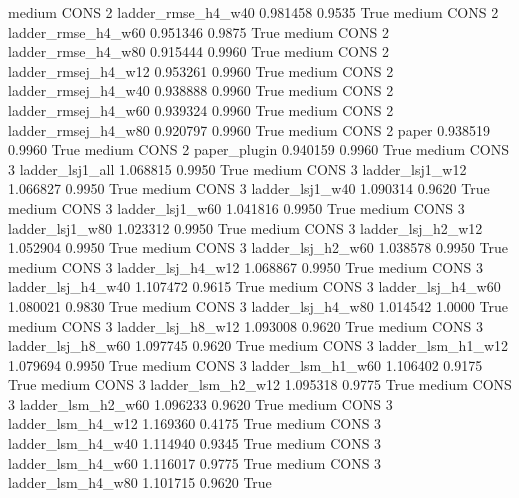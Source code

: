     medium     CONS                 2  ladder_rmse_h4_w40   0.981458      0.9535    True
    medium     CONS                 2  ladder_rmse_h4_w60   0.951346      0.9875    True
    medium     CONS                 2  ladder_rmse_h4_w80   0.915444      0.9960    True
    medium     CONS                 2 ladder_rmsej_h4_w12   0.953261      0.9960    True
    medium     CONS                 2 ladder_rmsej_h4_w40   0.938888      0.9960    True
    medium     CONS                 2 ladder_rmsej_h4_w60   0.939324      0.9960    True
    medium     CONS                 2 ladder_rmsej_h4_w80   0.920797      0.9960    True
    medium     CONS                 2               paper   0.938519      0.9960    True
    medium     CONS                 2        paper_plugin   0.940159      0.9960    True
    medium     CONS                 3     ladder_lsj1_all   1.068815      0.9950    True
    medium     CONS                 3     ladder_lsj1_w12   1.066827      0.9950    True
    medium     CONS                 3     ladder_lsj1_w40   1.090314      0.9620    True
    medium     CONS                 3     ladder_lsj1_w60   1.041816      0.9950    True
    medium     CONS                 3     ladder_lsj1_w80   1.023312      0.9950    True
    medium     CONS                 3   ladder_lsj_h2_w12   1.052904      0.9950    True
    medium     CONS                 3   ladder_lsj_h2_w60   1.038578      0.9950    True
    medium     CONS                 3   ladder_lsj_h4_w12   1.068867      0.9950    True
    medium     CONS                 3   ladder_lsj_h4_w40   1.107472      0.9615    True
    medium     CONS                 3   ladder_lsj_h4_w60   1.080021      0.9830    True
    medium     CONS                 3   ladder_lsj_h4_w80   1.014542      1.0000    True
    medium     CONS                 3   ladder_lsj_h8_w12   1.093008      0.9620    True
    medium     CONS                 3   ladder_lsj_h8_w60   1.097745      0.9620    True
    medium     CONS                 3   ladder_lsm_h1_w12   1.079694      0.9950    True
    medium     CONS                 3   ladder_lsm_h1_w60   1.106402      0.9175    True
    medium     CONS                 3   ladder_lsm_h2_w12   1.095318      0.9775    True
    medium     CONS                 3   ladder_lsm_h2_w60   1.096233      0.9620    True
    medium     CONS                 3   ladder_lsm_h4_w12   1.169360      0.4175    True
    medium     CONS                 3   ladder_lsm_h4_w40   1.114940      0.9345    True
    medium     CONS                 3   ladder_lsm_h4_w60   1.116017      0.9775    True
    medium     CONS                 3   ladder_lsm_h4_w80   1.101715      0.9620    True

